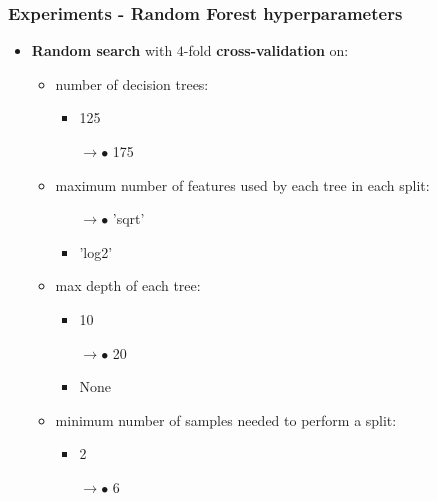 \documentclass{beamer}
\begin{document}
\begin{frame}
    \frametitle{Experiments - Random Forest hyperparameters}
    \begin{itemize}
        \item \textbf{Random search} with $4$-fold \textbf{cross-validation} on:
        \begin{itemize}
            \item number of decision trees:
            \begin{itemize}
                \item 125
                \item[$\rightarrow\bullet$] 175
            \end{itemize}
            \item maximum number of features used by each tree in each split:
            \begin{itemize}
                \item[$\rightarrow\bullet$] 'sqrt'
                \item 'log2'
            \end{itemize}
            \item max depth of each tree:
            \begin{itemize}
                \item 10
                \item[$\rightarrow\bullet$] 20
                \item None
            \end{itemize}
            \item minimum number of samples needed to perform a split:
            \begin{itemize}
                \item 2
                \item[$\rightarrow\bullet$] 6
            \end{itemize}
        \end{itemize}
    \end{itemize}
\end{frame}
\end{document}
